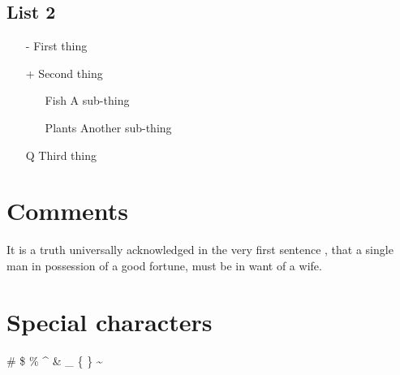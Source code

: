 \documentclass[a4paper,12pt]{article}
\begin{document}
\subsection{List 2}
\begin{itemize}
\item[-] First thing
\item[+] Second thing
\begin{itemize}
\item[Fish] A sub-thing
\item[Plants] Another sub-thing
\end{itemize}
\item[Q] Third thing
\end{itemize}
\section{Comments}
It is a truth universally acknowledged%
in the very first sentence
, that a single man in possession of a good fortune, must
be in want of a wife.
\section{Special characters}
\# \$ \% \^{} \& \_ \{ \} \~{}
\end{document}
